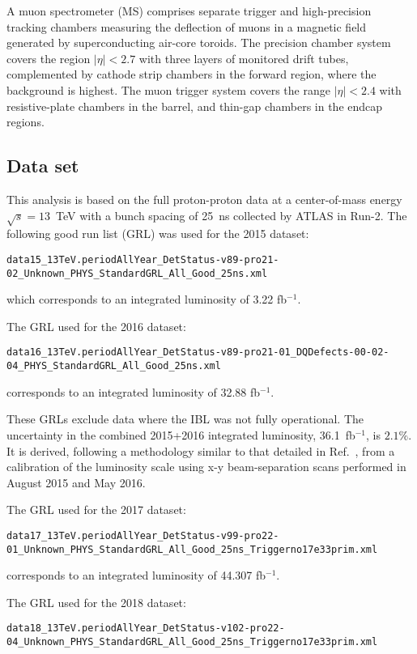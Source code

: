 A muon spectrometer (MS) comprises separate trigger and high-precision tracking chambers measuring the deflection of muons in a magnetic field generated by superconducting air-core toroids. The precision chamber system covers the region $| \eta |< 2.7$ with three layers of monitored drift tubes, complemented by cathode strip chambers in the forward region, where the background is highest. The muon trigger system covers the range $| \eta | < 2.4$ with resistive-plate chambers in the barrel, and thin-gap chambers in the endcap regions.

\subsection{Data set}
\label{sec:dataset}

This analysis is based on the full proton-proton data at a center-of-mass energy $\sqrt{s}=13$~TeV with a bunch spacing of 25~ns collected by ATLAS in Run-2. The following good run list (GRL) was used for the 2015 dataset:


{\tt\scriptsize data15\_13TeV.periodAllYear\_DetStatus-v89-pro21-02\_Unknown\_PHYS\_StandardGRL\_All\_Good\_25ns.xml}

which corresponds to an integrated luminosity of 3.22 fb$^{-1}$.

The GRL used for the 2016 dataset:

{\tt\scriptsize data16\_13TeV.periodAllYear\_DetStatus-v89-pro21-01\_DQDefects-00-02-04\_PHYS\_StandardGRL\_All\_Good\_25ns.xml}

corresponds to an integrated luminosity of 32.88 fb$^{-1}$.

These GRLs exclude data where the IBL was not fully operational. The uncertainty in the combined 2015+2016 integrated luminosity, 36.1~fb$^{-1}$, is $2.1\%$. It is derived, following a methodology similar to that detailed in Ref.~\cite{DAPR-2013-01}, from a calibration of the luminosity scale using x-y beam-separation scans performed in August 2015 and May 2016.

The GRL used for the 2017 dataset:

{\tt\scriptsize data17\_13TeV.periodAllYear\_DetStatus-v99-pro22-01\_Unknown\_PHYS\_StandardGRL\_All\_Good\_25ns\_Triggerno17e33prim.xml}

corresponds to an integrated luminosity of 44.307 fb$^{-1}$.

The GRL used for the 2018 dataset:

{\tt\scriptsize  data18\_13TeV.periodAllYear\_DetStatus-v102-pro22-04\_Unknown\_PHYS\_StandardGRL\_All\_Good\_25ns\_Triggerno17e33prim.xml}

